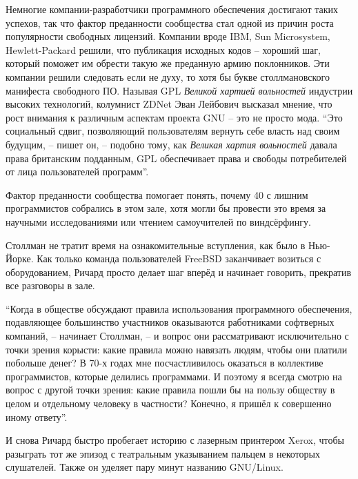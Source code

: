 Немногие компании-разработчики программного обеспечения достигают таких успехов, так что фактор преданности сообщества стал одной из причин роста популярности свободных лицензий. Компании вроде IBM, Sun Microsystem, Hewlett-Packard решили, что публикация исходных кодов -- хороший шаг, который поможет им обрести такую же преданную армию поклонников. Эти компании решили следовать если не духу, то хотя бы букве столлмановского манифеста свободного ПО. Называя GPL \textit{Великой хартией вольностей} индустрии высоких технологий, колумнист ZDNet Эван Лейбович высказал мнение, что рост внимания к различным аспектам проекта GNU -- это не просто мода. \enquote{Это социальный сдвиг, позволяющий пользователям вернуть себе власть над своим будущим, -- пишет он, -- подобно тому, как \textit{Великая хартия вольностей} давала права британским подданным, GPL обеспечивает права и свободы потребителей от лица пользователей программ}.

Фактор преданности сообщества помогает понять, почему 40 с лишним программистов собрались в этом зале, хотя могли бы провести это время за научными исследованиями или чтением самоучителей по виндсёрфингу.

Столлман не тратит время на ознакомительные вступления, как было в Нью-Йорке. Как только команда пользователей FreeBSD заканчивает возиться с оборудованием, Ричард просто делает шаг вперёд и начинает говорить, прекратив все разговоры в зале.

\enquote{Когда в обществе обсуждают правила использования программного обеспечения, подавляющее большинство участников оказываются работниками софтверных компаний, -- начинает Столлман, -- и вопрос они рассматривают исключительно с точки зрения корысти: какие правила можно навязать людям, чтобы они платили побольше денег? В 70-х годах мне посчастливилось оказаться в коллективе программистов, которые делились программами. И поэтому я всегда смотрю на вопрос с другой точки зрения: какие правила пошли бы на пользу обществу в целом и отдельному человеку в частности? Конечно, я пришёл к совершенно иному ответу}.

И снова Ричард быстро пробегает историю с лазерным принтером Xerox, чтобы разыграть тот же эпизод с театральным указыванием пальцем в некоторых слушателей. Также он уделяет пару минут названию GNU/Linux.

